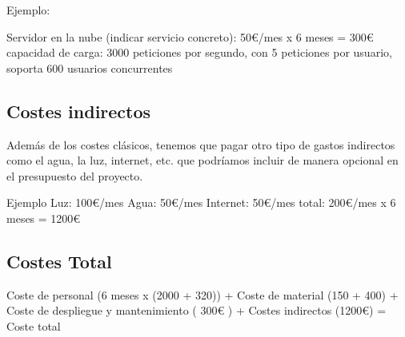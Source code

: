 Ejemplo:

Servidor en la nube (indicar servicio concreto): 50€/mes x 6 meses = 300€
    capacidad de carga: 3000 peticiones por segundo, con 5 peticiones por usuario, soporta 600 usuarios concurrentes
        
\subsection{Costes indirectos}

Además de los costes clásicos, tenemos que pagar otro tipo de gastos indirectos como el agua, la luz, internet, etc. que podríamos incluir de manera opcional en el presupuesto del proyecto.

Ejemplo
    Luz: 100€/mes
    Agua: 50€/mes 
    Internet: 50€/mes
    total: 200€/mes x 6 meses = 1200€

\subsection{Costes Total}

Coste de personal (6 meses x (2000 + 320)) + Coste de material (150 + 400) + Coste de despliegue y mantenimiento ( 300€ ) + Costes indirectos (1200€) = Coste total 
